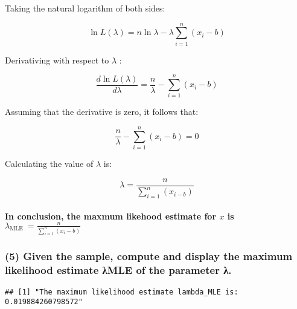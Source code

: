 \documentclass[
]{article}
\begin{document}
Taking the natural logarithm of both sides:

\[
\begin{equation}
\ln L(\lambda)=n \ln \lambda-\lambda \sum_{i=1}^{n}\left(x_{i}-b\right) \tag{2}
\end{equation}
\]

Derivativing with respect to \(\lambda\) :

\[
\begin{equation}
\frac{d \ln L(\lambda)}{d \lambda}=\frac{n}{\lambda}-\sum_{i=1}^{n}\left(x_{i}-b\right) \tag{3}
\end{equation}
\]

Assuming that the derivative is zero, it follows that:

\[
\begin{equation}
\frac{n}{\lambda}-\sum_{i=1}^{n}\left(x_{i}-b\right)=0 \tag{4}
\end{equation}
\]

Calculating the value of \(\lambda\) is:

\[
\begin{equation}
\lambda=\frac{n}{\sum_{i=1}^{n}\left(x_{i-b}\right)} \tag{5}
\end{equation}
\]

\paragraph{\texorpdfstring{In conclusion, the maxmum likehood estimate
for \(x\) is
\(\lambda_{\text {MLE }}=\frac{n}{\sum_{i=1}^{n}\left(x_{i}-b\right)}\)}{In conclusion, the maxmum likehood estimate for x is \textbackslash lambda\_\{\textbackslash text \{MLE \}\}=\textbackslash frac\{n\}\{\textbackslash sum\_\{i=1\}\^{}\{n\}\textbackslash left(x\_\{i\}-b\textbackslash right)\}}}\label{in-conclusion-the-maxmum-likehood-estimate-for-x-is-lambda_text-mle-fracnsum_i1nleftx_i-bright}

\subsubsection{(5) Given the sample, compute and display the maximum
likelihood estimate λMLE of the parameter
λ.}\label{given-the-sample-compute-and-display-the-maximum-likelihood-estimate-ux3bbmle-of-the-parameter-ux3bb.}

\begin{verbatim}
## [1] "The maximum likelihood estimate lambda_MLE is:  0.019884260798572"
\end{verbatim}
\end{document}
